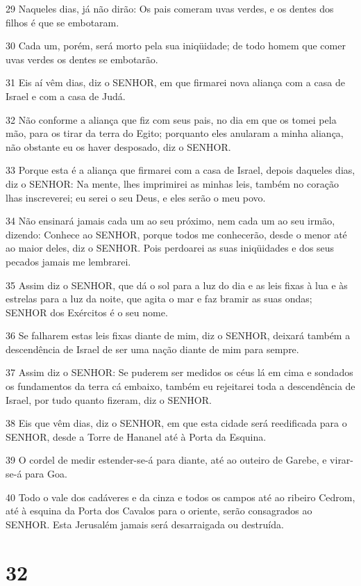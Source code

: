 \par 29 Naqueles dias, já não dirão: Os pais comeram uvas verdes, e os dentes dos filhos é que se embotaram.
\par 30 Cada um, porém, será morto pela sua iniqüidade; de todo homem que comer uvas verdes os dentes se embotarão.
\par 31 Eis aí vêm dias, diz o SENHOR, em que firmarei nova aliança com a casa de Israel e com a casa de Judá.
\par 32 Não conforme a aliança que fiz com seus pais, no dia em que os tomei pela mão, para os tirar da terra do Egito; porquanto eles anularam a minha aliança, não obstante eu os haver desposado, diz o SENHOR.
\par 33 Porque esta é a aliança que firmarei com a casa de Israel, depois daqueles dias, diz o SENHOR: Na mente, lhes imprimirei as minhas leis, também no coração lhas inscreverei; eu serei o seu Deus, e eles serão o meu povo.
\par 34 Não ensinará jamais cada um ao seu próximo, nem cada um ao seu irmão, dizendo: Conhece ao SENHOR, porque todos me conhecerão, desde o menor até ao maior deles, diz o SENHOR. Pois perdoarei as suas iniqüidades e dos seus pecados jamais me lembrarei.
\par 35 Assim diz o SENHOR, que dá o sol para a luz do dia e as leis fixas à lua e às estrelas para a luz da noite, que agita o mar e faz bramir as suas ondas; SENHOR dos Exércitos é o seu nome.
\par 36 Se falharem estas leis fixas diante de mim, diz o SENHOR, deixará também a descendência de Israel de ser uma nação diante de mim para sempre.
\par 37 Assim diz o SENHOR: Se puderem ser medidos os céus lá em cima e sondados os fundamentos da terra cá embaixo, também eu rejeitarei toda a descendência de Israel, por tudo quanto fizeram, diz o SENHOR.
\par 38 Eis que vêm dias, diz o SENHOR, em que esta cidade será reedificada para o SENHOR, desde a Torre de Hananel até à Porta da Esquina.
\par 39 O cordel de medir estender-se-á para diante, até ao outeiro de Garebe, e virar-se-á para Goa.
\par 40 Todo o vale dos cadáveres e da cinza e todos os campos até ao ribeiro Cedrom, até à esquina da Porta dos Cavalos para o oriente, serão consagrados ao SENHOR. Esta Jerusalém jamais será desarraigada ou destruída.

\chapter{32}

